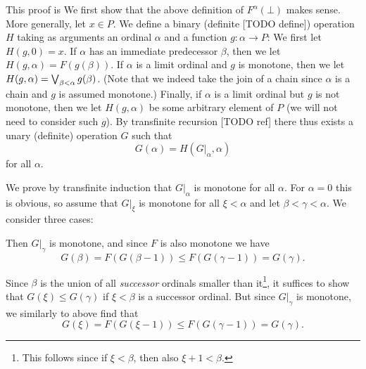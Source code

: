 \documentclass[a4paper, 11pt, article, danish, oneside]{memoir}
\DeclareMathOperator*{\smallbigvee}{\textstyle\bigvee}
\DeclareMathOperator*{\bigjoin}{\mathchoice
    {\smallbigvee}%
    {\bigvee}%
    {\bigvee}%
    {\bigvee}%
}
\begin{document}
\begin{prooffootnote}{This proof is }
    We first show that the above definition of $F^\alpha(\bot)$ makes sense. More generally, let $x \in P$. We define a binary (definite [TODO define]) operation $H$ taking as arguments an ordinal $\alpha$ and a function $g \colon \alpha \to P$: We first let $H(g,0) = x$. If $\alpha$ has an immediate predecessor $\beta$, then we let $H(g,\alpha) = F(g(\beta))$. If $\alpha$ is a limit ordinal and $g$ is monotone, then we let $H(g,\alpha) = \bigjoin_{\beta < \alpha} g(\beta)$. (Note that we indeed take the join of a chain since $\alpha$ is a chain and $g$ is assumed monotone.) Finally, if $\alpha$ is a limit ordinal but $g$ is not monotone, then we let $H(g,\alpha)$ be some arbitrary element of $P$ (we will not need to consider such $g$). By transfinite recursion [TODO ref] there thus exists a unary (definite) operation $G$ such that
    \begin{equation*}
        G(\alpha)
            = H(G|_\alpha, \alpha)
    \end{equation*}
    for all $\alpha$.
    
    We prove by transfinite induction that $G|_\alpha$ is monotone for all $\alpha$. For $\alpha = 0$ this is obvious, so assume that $G|_\xi$ is monotone for all $\xi < \alpha$ and let $\beta < \gamma < \alpha$. We consider three cases:
    \begin{proofsec}
        \item[$\beta$ and $\gamma$ are successors]
        Then $G|_\gamma$ is monotone, and since $F$ is also monotone we have
        \begin{equation*}
            G(\beta)
                = F(G(\beta-1))
                \leq F(G(\gamma-1))
                = G(\gamma).
        \end{equation*}

        \item[$\beta$ is a limit, $\gamma$ is a successor]
        Since $\beta$ is the union of all \emph{successor} ordinals smaller than it\footnote{This follows since if $\xi < \beta$, then also $\xi + 1 < \beta$.}, it suffices to show that $G(\xi) \leq G(\gamma)$ if $\xi < \beta$ is a successor ordinal. But since $G|_\gamma$ is monotone, we similarly to above find that
        \begin{equation*}
            G(\xi)
                = F(G(\xi-1))
                \leq F(G(\gamma-1))
                = G(\gamma).
        \end{equation*}


\end{proofsec}
\end{prooffootnote}
\end{document}
